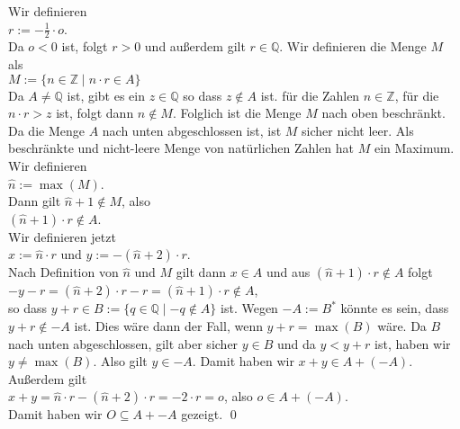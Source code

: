 \begin{enumerate}
      Wir definieren 
      \\[0.2cm]
      \hspace*{1.3cm}
      $r := -\frac{1}{2} \cdot o$.
      \\[0.2cm]
      Da $o < 0$ ist, folgt $r > 0$ und außerdem gilt $r \in \mathbb{Q}$.  Wir definieren die Menge
      $M$ als
      \\[0.2cm]
      \hspace*{1.3cm}
      $M := \{ n \in \mathbb{Z} \mid n \cdot r \in  A \}$
      \\[0.2cm]
      Da $A \not= \mathbb{Q}$ ist, gibt es ein $z \in \mathbb{Q}$ so dass $z \not\in A$ ist.
      für die Zahlen $n \in \mathbb{Z}$, für die $n \cdot r > z$ ist, folgt dann $n \not\in M$.
      Folglich ist die Menge $M$ nach oben beschränkt.
      Da die Menge $A$ nach unten abgeschlossen ist, ist $M$ sicher nicht leer.
      Als beschränkte und nicht-leere Menge von natürlichen Zahlen hat $M$ ein Maximum.  Wir definieren 
      \\[0.2cm]
      \hspace*{1.3cm}
      $\widehat{n} := \max(M)$.
      \\[0.2cm]
      Dann gilt $\widehat{n} + 1 \not\in M$, also 
      \\[0.2cm]
      \hspace*{1.3cm}
      $(\widehat{n} + 1) \cdot r \not\in A$.  
      \\[0.2cm]
      Wir  definieren  jetzt
      \\[0.2cm]
      \hspace*{1.3cm}
      $x := \widehat{n} \cdot r$ \quad und \quad $y := -(\widehat{n} + 2) \cdot r$.  
      \\[0.2cm]
      Nach  Definition von $\widehat{n}$ und $M$ gilt dann $x \in A$ und aus 
      $(\widehat{n} + 1) \cdot r \not\in A$ folgt
      \\[0.2cm]
      \hspace*{1.3cm}
      $-y - r = (\widehat{n} + 2) \cdot r - r = (\widehat{n} + 1) \cdot r \not\in A$,
      \\[0.2cm]
      so dass $y + r\in B := \{ q \in \mathbb{Q} \mid -q \not\in A \}$ ist.  
      Wegen $-A := B^*$ könnte es sein, dass $y+r \not\in -A$ ist.  Dies wäre dann der Fall,
      wenn $y+r = \max(B)$ wäre.  Da $B$ nach unten abgeschlossen, gilt aber sicher $y \in B$
      und da $y < y + r$ ist, haben wir $y \not= \max(B)$.  Also gilt  $y \in -A$.  Damit haben wir $x + y \in A + (-A)$.
      Außerdem gilt
      \\[0.2cm]
      \hspace*{1.3cm}
      $x + y = \widehat{n} \cdot r - (\widehat{n} + 2) \cdot r = - 2 \cdot r = o$, \quad also \quad $o \in A + (-A)$.
      \\[0.2cm]
      Damit haben wir $O \subseteq A + -\!A$ gezeigt. 
      \qed
\end{enumerate}

